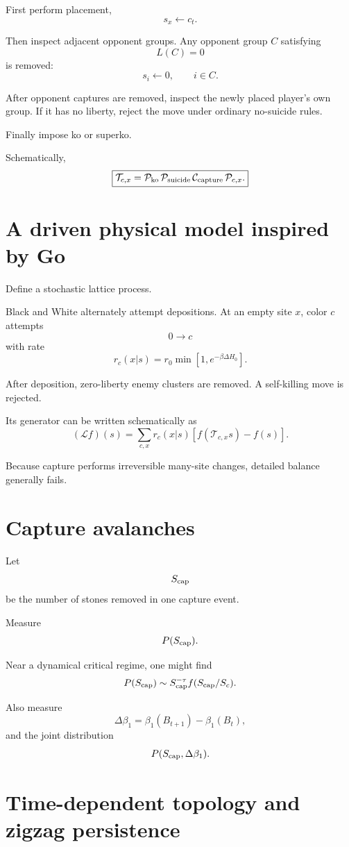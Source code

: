 \documentclass[11pt]{article}
\begin{document}
First perform placement,
\[
s_x\leftarrow c_t.
\]

Then inspect adjacent opponent groups. Any opponent group \(C\) satisfying
\[
L(C)=0
\]
is removed:
\[
s_i\leftarrow0,
\qquad i\in C.
\]

After opponent captures are removed, inspect the newly placed player's own group. If it has no liberty, reject the move under ordinary no-suicide rules.

Finally impose ko or superko.

Schematically,
\[
\boxed{
\mathcal T_{c,x}
=
\mathcal P_{\rm ko}
\,
\mathcal P_{\rm suicide}
\,
\mathcal C_{\rm capture}
\,
\mathcal P_{c,x}.
}
\]

\section{A driven physical model inspired by Go}

Define a stochastic lattice process.

Black and White alternately attempt depositions. At an empty site \(x\), color \(c\) attempts
\[
0\rightarrow c
\]
with rate
\[
r_c(x|s)
=
r_0
\min\left[
1,
e^{-\beta\Delta H_0}
\right].
\]

After deposition, zero-liberty enemy clusters are removed. A self-killing move is rejected.

Its generator can be written schematically as
\[
(\mathcal L f)(s)
=
\sum_{c,x}
r_c(x|s)
\left[
f(\mathcal T_{c,x}s)-f(s)
\right].
\]

Because capture performs irreversible many-site changes, detailed balance generally fails.

\section{Capture avalanches}

Let
\[
S_{\rm cap}
\]
be the number of stones removed in one capture event.

Measure
\[
P(S_{\rm cap}).
\]

Near a dynamical critical regime, one might find
\[
P(S_{\rm cap})
\sim
S_{\rm cap}^{-\tau}
f(S_{\rm cap}/S_c).
\]

Also measure
\[
\Delta\beta_1
=
\beta_1(B_{t+1})
-
\beta_1(B_t),
\]
and the joint distribution
\[
P(S_{\rm cap},\Delta\beta_1).
\]

\section{Time-dependent topology and zigzag persistence}
\end{document}
